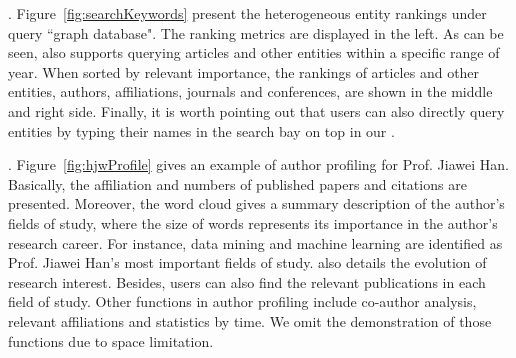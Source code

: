 
.
Figure~\ref{fig:searchKeywords} present the heterogeneous entity rankings under query ``graph database".
%
The ranking metrics are displayed in the left. As can be seen, \oursystem also supports querying articles and other entities within a specific range of year.
When sorted by relevant importance, the rankings of articles and other entities, \ie authors, affiliations, journals and conferences, are shown in the middle and right side.
%
Finally, it is worth pointing out that users can also directly query entities by typing their names in the search bay on top in our \oursystem.




.
Figure~\ref{fig:hjwProfile} gives an example of author profiling for Prof. Jiawei Han. 
Basically, the affiliation and numbers of published papers and citations are presented.
Moreover, the word cloud gives a summary description of the author's fields of study, where the size of words represents its importance in the author's research career. For instance, data mining and machine learning are identified as Prof. Jiawei Han's most important fields of study.
\oursystem also details the evolution of research interest. %
Besides, users can also find the relevant publications in each field of study. Other functions in author profiling include co-author analysis, relevant affiliations and statistics by time. We omit the demonstration of those functions due to space limitation.


